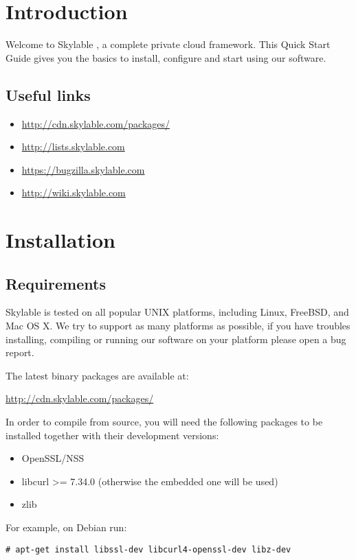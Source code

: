 \LARGE
\chapter{Introduction}

\indent Welcome to Skylable \SX, a complete private cloud framework.
This Quick Start Guide gives you the basics to install, configure
and start using our software.
\bigskip

\section*{Useful links}
\begin{itemize}
    \item \url{http://cdn.skylable.com/packages/}
    \item \url{http://lists.skylable.com}
    \item \url{https://bugzilla.skylable.com}
    \item \url{http://wiki.skylable.com}
\end{itemize}

\chapter{Installation}

\section*{Requirements}

Skylable \SX is tested on all popular UNIX platforms, including Linux,
FreeBSD, and Mac OS X. We try to support as many platforms as possible,
if you have troubles installing, compiling or running our software on
your platform please open a bug report.
\bigskip

The latest binary packages are available at:
\smallskip

\url{http://cdn.skylable.com/packages/}
\bigskip

In order to compile \SX from source, you
will need the following packages to be installed together with their
development versions:
\begin{itemize}
    \item OpenSSL/NSS
    \item libcurl >= 7.34.0 (otherwise the embedded one will be used)
    \item zlib
\end{itemize}
For example, on Debian run:
\small
\begin{lstlisting}
# apt-get install libssl-dev libcurl4-openssl-dev libz-dev
\end{lstlisting}
\LARGE

